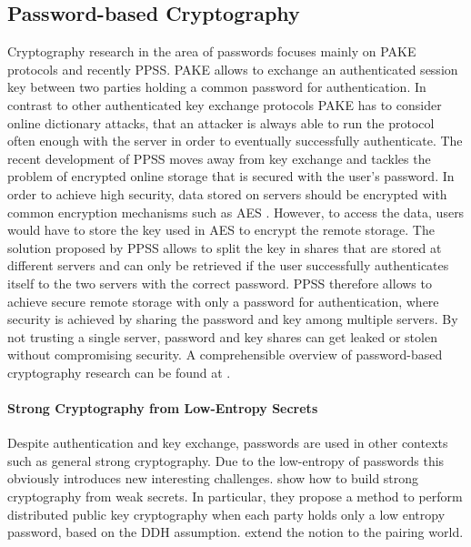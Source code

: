 \subsection{Password-based Cryptography}
Cryptography research in the area of passwords focuses mainly on \ac{PAKE} protocols and recently \ac{PPSS}.
\ac{PAKE} allows to exchange an authenticated session key between two parties holding a common password for authentication.
In contrast to other authenticated key exchange protocols \ac{PAKE} has to consider online dictionary attacks, \ie that an attacker is always able to run the protocol often enough with the server in order to eventually successfully authenticate.
The recent development of \ac{PPSS} moves away from key exchange and tackles the problem of encrypted online storage that is secured with the user's password.
In order to achieve high security, data stored on servers should be encrypted with common encryption mechanisms such as \ac{AES} \cite{FIPS-197}.
However, to access the data, users would have to store the key used in \ac{AES} to encrypt the remote storage.
The solution proposed by \ac{PPSS} allows to split the key in shares that are stored at different servers and can only be retrieved if the user successfully authenticates itself to the two servers with the correct password.
\ac{PPSS} therefore allows to achieve secure remote storage with only a password for authentication, where security is achieved by sharing the password and key among multiple servers.
By not trusting a single server, password and key shares can get leaked or stolen without compromising security.
A comprehensible overview of password-based cryptography research can be found at \citet{KieferXX}.

\paragraph{Strong Cryptography from Low-Entropy Secrets}
Despite authentication and key exchange, passwords are used in other contexts such as general strong cryptography.
Due to the low-entropy of passwords this obviously introduces new interesting challenges.
\citet{AbdallaBCP09} show how to build strong cryptography from weak secrets.
In particular, they propose a method to perform distributed public key cryptography when each party holds only a low entropy password, based on the \ac{DDH} assumption.
\citet{BoyenCFP10} extend the notion to the pairing world.


